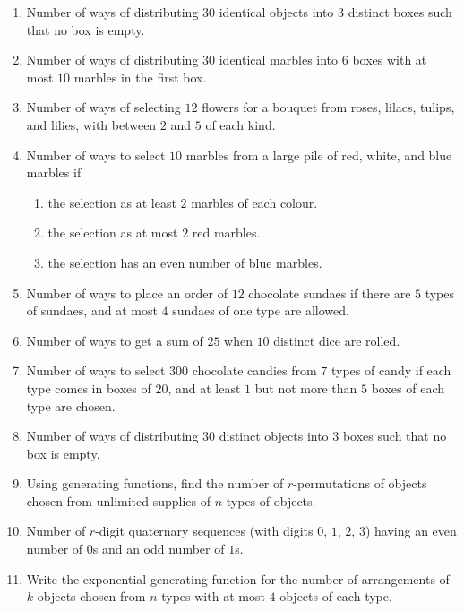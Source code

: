 \documentclass[svgnames]{amsart}
\begin{document}
\begin{enumerate}[leftmargin=*]
\item Number of ways of distributing $30$ identical objects into $3$ distinct boxes such that no box is empty.

\item Number of ways of distributing $30$ identical marbles into $6$ boxes with at most $10$ marbles in the first box.

\item Number of ways of selecting $12$ flowers for a bouquet from roses, lilacs, tulips, and lilies, with between $2$ and $5$ of each kind.

\item Number of ways to select $10$ marbles from a large pile of red, white, and blue marbles if
\begin{enumerate}[label=(\roman*)]
	\item the selection as at least $2$ marbles of each colour.
	\item the selection as at most $2$ red marbles.
	\item the selection has an even number of blue marbles.
\end{enumerate}

\item Number of ways to place an order of $12$ chocolate sundaes if there are $5$ types of sundaes, and at most $4$ sundaes of one type are allowed.

\item Number of ways to get a sum of $25$ when $10$ distinct dice are rolled.

\item Number of ways to select $300$ chocolate candies from $7$ types of candy if each type comes in boxes of $20$, and at least $1$ but not more than $5$ boxes of each type are chosen.

\item Number of ways of distributing $30$ distinct objects into $3$ boxes such that no box is empty.

\item Using generating functions, find the number of $r$-permutations of objects chosen from unlimited supplies of $n$ types of objects.

\item Number of $r$-digit quaternary sequences (with digits $0$, $1$, $2$, $3$) having an even number of $0$s and an odd number of $1$s.

\item Write the exponential generating function for the number of arrangements of $k$ objects chosen from $n$ types with at most $4$ objects of each type.


\end{enumerate}
\end{document}
